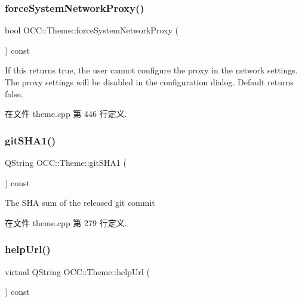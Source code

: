 \subsubsection{\texorpdfstring{force\+System\+Network\+Proxy()}{forceSystemNetworkProxy()}}
{\footnotesize\ttfamily bool O\+C\+C\+::\+Theme\+::force\+System\+Network\+Proxy (\begin{DoxyParamCaption}{ }\end{DoxyParamCaption}) const\hspace{0.3cm}{\ttfamily [virtual]}}

If this returns true, the user cannot configure the proxy in the network settings. The proxy settings will be disabled in the configuration dialog. Default returns false. 

在文件 theme.\+cpp 第 446 行定义.

\mbox{\label{class_o_c_c_1_1_theme_a2775c2774c9b250275ad0f43d84dfcd6}} 
\subsubsection{\texorpdfstring{git\+S\+H\+A1()}{gitSHA1()}}
{\footnotesize\ttfamily Q\+String O\+C\+C\+::\+Theme\+::git\+S\+H\+A1 (\begin{DoxyParamCaption}{ }\end{DoxyParamCaption}) const}

The S\+HA sum of the released git commit 

在文件 theme.\+cpp 第 279 行定义.

\mbox{\label{class_o_c_c_1_1_theme_aba73a024ee17d93542b7a129d4cea822}} 
\subsubsection{\texorpdfstring{help\+Url()}{helpUrl()}}
{\footnotesize\ttfamily virtual Q\+String O\+C\+C\+::\+Theme\+::help\+Url (\begin{DoxyParamCaption}{ }\end{DoxyParamCaption}) const\hspace{0.3cm}{\ttfamily [virtual]}}


